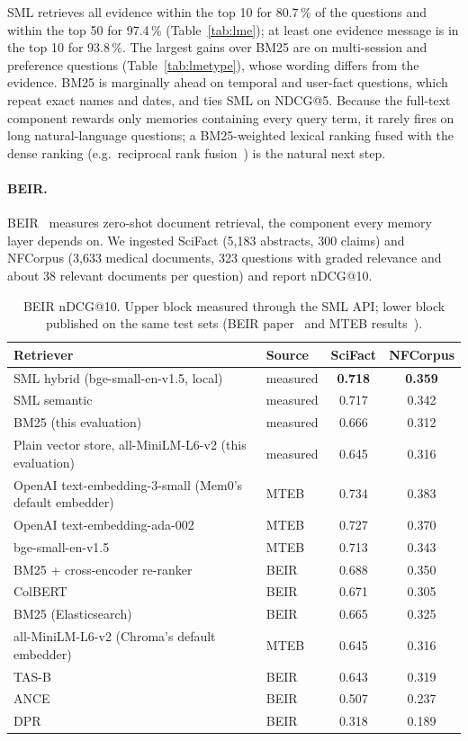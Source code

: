 \documentclass[11pt,a4paper]{article}
\newcommand{\sys}{SML}
\newcommand{\best}[1]{\textbf{#1}}
\begin{document}
\sys{} retrieves all evidence within the top 10 for 80.7\,\% of the questions and within the top 50 for
97.4\,\% (Table~\ref{tab:lme}); at least one evidence message is in the top 10 for 93.8\,\%. The largest
gains over BM25 are on multi-session and preference questions (Table~\ref{tab:lmetype}), whose wording differs
from the evidence. BM25 is marginally ahead on temporal and user-fact questions, which repeat exact names and
dates, and ties \sys{} on NDCG@5. Because the full-text component rewards only memories containing every query
term, it rarely fires on long natural-language questions; a BM25-weighted lexical ranking fused with the
dense ranking (e.g.\ reciprocal rank fusion~\cite{cormack2009rrf}) is the natural next step.

\paragraph{BEIR.} BEIR~\cite{thakur2021beir} measures zero-shot document retrieval, the component every
memory layer depends on. We ingested SciFact (5{,}183 abstracts, 300 claims) and NFCorpus (3{,}633 medical
documents, 323 questions with graded relevance and about 38 relevant documents per question) and report
nDCG@10.

\begin{table}[htbp]
\centering
\small
\caption{BEIR nDCG@10. Upper block measured through the \sys{} API; lower block published on the same test
sets (BEIR paper~\cite{thakur2021beir} and MTEB results~\cite{muennighoff2023mteb}).}
\label{tab:beir}
\begin{tabular}{@{}llcc@{}}
\toprule
Retriever & Source & SciFact & NFCorpus \\
\midrule
\sys{} hybrid (bge-small-en-v1.5, local) & measured & \best{0.718} & \best{0.359} \\
\sys{} semantic & measured & 0.717 & 0.342 \\
BM25 (this evaluation) & measured & 0.666 & 0.312 \\
Plain vector store, all-MiniLM-L6-v2 (this evaluation) & measured & 0.645 & 0.316 \\
\midrule
OpenAI text-embedding-3-small (Mem0's default embedder) & MTEB & 0.734 & 0.383 \\
OpenAI text-embedding-ada-002 & MTEB & 0.727 & 0.370 \\
bge-small-en-v1.5 & MTEB & 0.713 & 0.343 \\
BM25 + cross-encoder re-ranker & BEIR & 0.688 & 0.350 \\
ColBERT & BEIR & 0.671 & 0.305 \\
BM25 (Elasticsearch) & BEIR & 0.665 & 0.325 \\
all-MiniLM-L6-v2 (Chroma's default embedder) & MTEB & 0.645 & 0.316 \\
TAS-B & BEIR & 0.643 & 0.319 \\
ANCE & BEIR & 0.507 & 0.237 \\
DPR & BEIR & 0.318 & 0.189 \\
\bottomrule
\end{tabular}
\end{table}
\end{document}
